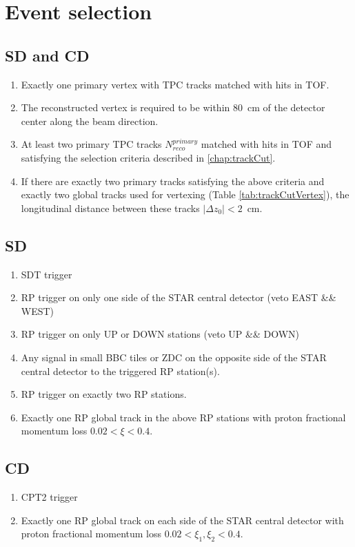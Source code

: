 \section{Event selection}
\subsection{SD and CD}
\begin{enumerate}
	\item Exactly one primary vertex with TPC tracks matched with hits in TOF.
	\item The reconstructed vertex is required to be within $80$~cm of the detector center along the  beam direction.
	\item At least two primary TPC tracks $N^{primary}_{reco}$ matched with hits in TOF and satisfying the selection criteria described in  \ref{chap:trackCut}.
	\item If there are exactly two primary tracks satisfying the above criteria and exactly two global tracks used for vertexing (Table \ref{tab:trackCutVertex}), the longitudinal distance between these tracks $|\Delta z_0|<2$~cm.
\end{enumerate}
\subsection{SD}
\begin{enumerate}
	\item SDT trigger 
	\item RP trigger on only one side of the STAR central detector (veto EAST \&\& WEST)
	\item RP trigger on only UP or DOWN  stations (veto UP \&\& DOWN)
	\item Any signal in small BBC tiles or ZDC on the opposite side of the STAR central detector to the triggered RP station(s).
	\item RP trigger on exactly two RP stations.
	\item Exactly one RP global track in the above RP stations with proton fractional momentum loss $0.02 < \xi < 0.4$.
\end{enumerate}

\subsection{CD}
\begin{enumerate}
	\item CPT2 trigger 
	\item Exactly one RP global track on each side of the STAR central detector with proton fractional momentum loss $0.02 < \xi_1,\xi_2 < 0.4$.
\end{enumerate}
